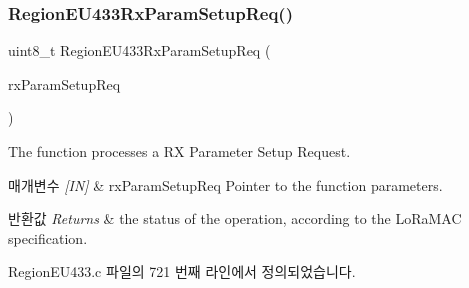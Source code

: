 \subsubsection{\texorpdfstring{Region\+E\+U433\+Rx\+Param\+Setup\+Req()}{RegionEU433RxParamSetupReq()}}
{\footnotesize\ttfamily uint8\+\_\+t Region\+E\+U433\+Rx\+Param\+Setup\+Req (\begin{DoxyParamCaption}\item[{\mbox{\hyperlink{group___r_e_g_i_o_n_ga7165f282c670c728c36d534df2285157}{Rx\+Param\+Setup\+Req\+Params\+\_\+t}} $\ast$}]{rx\+Param\+Setup\+Req }\end{DoxyParamCaption})}



The function processes a RX Parameter Setup Request. 


\begin{DoxyParams}{매개변수}
{\em \mbox{[}\+I\+N\mbox{]}} & rx\+Param\+Setup\+Req Pointer to the function parameters.\\
\hline
\end{DoxyParams}

\begin{DoxyRetVals}{반환값}
{\em Returns} & the status of the operation, according to the Lo\+Ra\+M\+AC specification. \\
\hline
\end{DoxyRetVals}


Region\+E\+U433.\+c 파일의 721 번째 라인에서 정의되었습니다.


